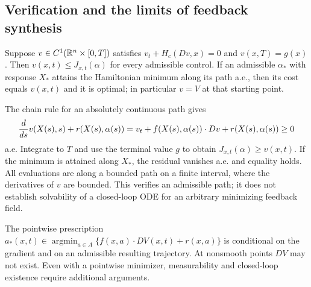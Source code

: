 \subsection{Verification and the limits of feedback synthesis}
\Needspace{55mm}
\begin{theorem}
Suppose $v\in C^1(\mathbb{R}^n\times[0,T])$ satisfies
$v_t+H_c(Dv,x)=0$ and $v(x,T)=g(x)$. Then $v(x,t)\leq J_{x,t}(\alpha)$
for every admissible control. If an admissible $\alpha_*$ with response
$X_*$ attains the Hamiltonian minimum along its path a.e., then its cost
equals $v(x,t)$ and it is optimal; in particular $v=V$ at that starting point.
\end{theorem}
\begin{expandedproof}
The chain rule for an absolutely continuous path gives
\[
 {d\over ds}v(X(s),s)+r(X(s),\alpha(s))
 =v_t+f(X(s),\alpha(s))\cdot Dv+r(X(s),\alpha(s))\geq0
\]
a.e. Integrate to $T$ and use the terminal value $g$ to obtain
$J_{x,t}(\alpha)\geq v(x,t)$. If the minimum is attained along $X_*$,
the residual vanishes a.e. and equality holds. All evaluations are along
a bounded path on a finite interval, where the derivatives of $v$ are bounded.
This verifies an admissible path; it does not establish solvability of a
closed-loop ODE for an arbitrary minimizing feedback field.
\end{expandedproof}
The pointwise prescription
$a_*(x,t)\in\operatorname*{argmin}_{a\in A}\{f(x,a)\cdot DV(x,t)+r(x,a)\}$
is conditional on the gradient and on an admissible resulting trajectory.
At nonsmooth points $DV$ may not exist. Even with a pointwise minimizer,
measurability and closed-loop existence require additional arguments.
\Needspace{42mm}

\Needspace{70mm}

